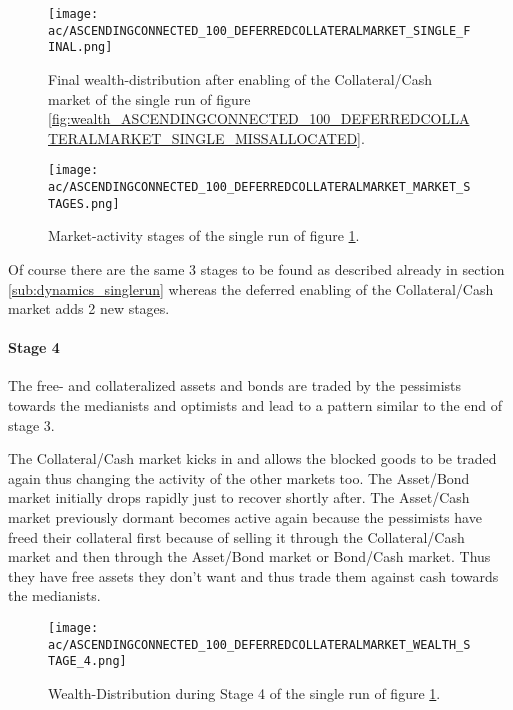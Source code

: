 \documentclass[Bachelorarbeit.tex]{subfiles}
\begin{document}
\begin{figure}[H]
	\centering
  \texttt{[image: ac/ASCENDINGCONNECTED\_100\_DEFERREDCOLLATERALMARKET\_SINGLE\_FINAL.png]}
  	\caption{Final wealth-distribution after enabling of the Collateral/Cash market of the single run of figure \ref{fig:wealth_ASCENDINGCONNECTED_100_DEFERREDCOLLATERALMARKET_SINGLE_MISSALLOCATED}.}
	\label{fig:wealth_ASCENDINGCONNECTED_100_DEFERREDCOLLATERALMARKET_SINGLE_FINAL}
\end{figure}

\begin{figure}[H]
	\centering
  \texttt{[image: ac/ASCENDINGCONNECTED\_100\_DEFERREDCOLLATERALMARKET\_MARKET\_STAGES.png]}
  	\caption{Market-activity stages of the single run of figure \ref{fig:wealth_ASCENDINGCONNECTED_100_DEFERREDCOLLATERALMARKET_SINGLE_FINAL}.}
	\label{fig:markets_ASCENDINGCONNECTED_100_DEFERREDCOLLATERALMARKET_MARKET_STAGES}
\end{figure}

Of course there are the same 3 stages to be found as described already in section \ref{sub:dynamics_singlerun} whereas the deferred enabling of the Collateral/Cash market adds 2 new stages.

\paragraph{Stage 4}
The free- and collateralized assets and bonds are traded by the pessimists towards the medianists and optimists and lead to a pattern similar to the end of stage 3.

\medskip

The Collateral/Cash market kicks in and allows the blocked goods to be traded again thus changing the activity of the other markets too. The Asset/Bond market initially drops rapidly just to recover shortly after. The Asset/Cash market previously dormant becomes active again because the pessimists have freed their collateral first because of selling it through the Collateral/Cash market and then through the Asset/Bond market or Bond/Cash market. Thus they have free assets they don't want and thus trade them against cash towards the medianists.

\begin{figure}[H]
	\centering
  \texttt{[image: ac/ASCENDINGCONNECTED\_100\_DEFERREDCOLLATERALMARKET\_WEALTH\_STAGE\_4.png]}
  	\caption{Wealth-Distribution during Stage 4 of the single run of figure \ref{fig:wealth_ASCENDINGCONNECTED_100_DEFERREDCOLLATERALMARKET_SINGLE_FINAL}.}
	\label{fig:markets_ASCENDINGCONNECTED_100_DEFERREDCOLLATERALMARKET_WEALTH_STAGE_4}
\end{figure}
\end{document}
